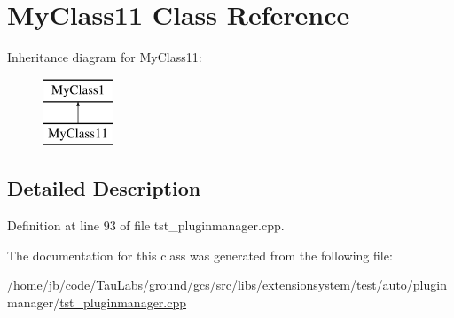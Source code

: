 \hypertarget{class_my_class11}{\section{\-My\-Class11 \-Class \-Reference}
\label{class_my_class11}
}
\-Inheritance diagram for \-My\-Class11\-:\begin{figure}[H]
\begin{center}
\leavevmode
\includegraphics[height=2.000000cm]{class_my_class11}
\end{center}
\end{figure}


\subsection{\-Detailed \-Description}


\-Definition at line 93 of file tst\-\_\-pluginmanager.\-cpp.



\-The documentation for this class was generated from the following file\-:\begin{DoxyCompactItemize}
\item 
/home/jb/code/\-Tau\-Labs/ground/gcs/src/libs/extensionsystem/test/auto/pluginmanager/\hyperlink{tst__pluginmanager_8cpp}{tst\-\_\-pluginmanager.\-cpp}\end{DoxyCompactItemize}
